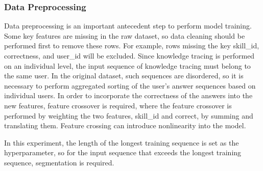 \subsubsection{Data Preprocessing}
Data preprocessing is an important antecedent step to perform model training. Some key features are missing in the raw dataset, so data cleaning should be performed first to remove these rows. For example, rows missing the key skill\_id, correctness, and user\_id will be excluded. Since knowledge tracing is performed on an individual level, the input sequence of knowledge tracing must belong to the same user. In the original dataset, such sequences are disordered, so it is necessary to perform aggregated sorting of the user's answer sequences based on individual users. In order to incorporate the correctness of the answers into the new features, feature crossover is required, where the feature crossover is performed by weighting the two features, skill\_id and correct, by summing and translating them. Feature crossing can introduce nonlinearity into the model.

In this experiment, the length of the longest training sequence is set as the hyperparameter, so for the input sequence that exceeds the longest training sequence, segmentation is required.

